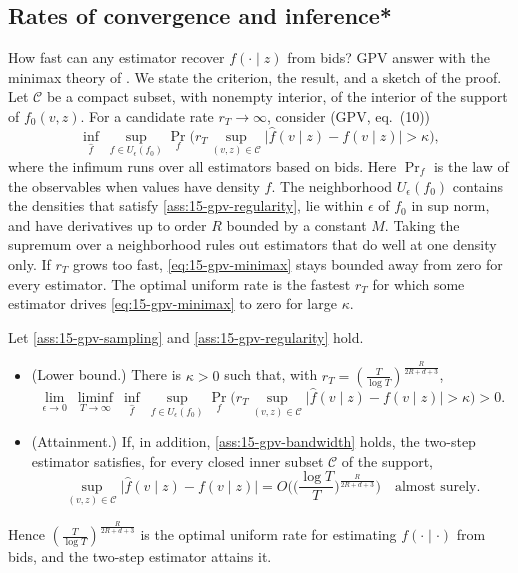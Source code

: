 \subsection{Rates of convergence and inference*}\label{sec:15-gpv-rates}

How fast can any estimator recover $f(\cdot\mid z)$ from bids? GPV answer with the minimax theory of \citet{IbragimovHasminskii1981}. We state the criterion, the result, and a sketch of the proof. Let $\mathcal C$ be a compact subset, with nonempty interior, of the interior of the support of $f_0(v,z)$. For a candidate rate $r_T\to\infty$, consider (GPV, eq.~(10))
\begin{equation}\label{eq:15-gpv-minimax}
\inf_{\hat f}\ \sup_{f\in U_\epsilon(f_0)}\Pr_f\Big(r_T\sup_{(v,z)\in\mathcal C}\big|\hat f(v\mid z)-f(v\mid z)\big|>\kappa\Big),
\end{equation}
where the infimum runs over all estimators based on bids. Here $\Pr_f$ is the law of the observables when values have density $f$. The neighborhood $U_\epsilon(f_0)$ contains the densities that satisfy \cref{ass:15-gpv-regularity}, lie within $\epsilon$ of $f_0$ in sup norm, and have derivatives up to order $R$ bounded by a constant $M$. Taking the supremum over a neighborhood rules out estimators that do well at one density only. If $r_T$ grows too fast, \eqref{eq:15-gpv-minimax} stays bounded away from zero for every estimator. The optimal uniform rate is the fastest $r_T$ for which some estimator drives \eqref{eq:15-gpv-minimax} to zero for large $\kappa$.

\begin{theorem}\label{thm:15-gpv-rate}
Let \cref{ass:15-gpv-sampling} and \cref{ass:15-gpv-regularity} hold.
\begin{itemize}
\item[(i)] (Lower bound.) There is $\kappa>0$ such that, with $r_T=(\frac{T}{\log T})^{\frac{R}{2R+d+3}}$,
\[
\lim_{\epsilon\to0}\ \liminf_{T\to\infty}\ \inf_{\hat f}\ \sup_{f\in U_\epsilon(f_0)}\Pr_f\Big(r_T\sup_{(v,z)\in\mathcal C}\big|\hat f(v\mid z)-f(v\mid z)\big|>\kappa\Big)>0.
\]
\item[(ii)] (Attainment.) If, in addition, \cref{ass:15-gpv-bandwidth} holds, the two-step estimator satisfies, for every closed inner subset $\mathcal C$ of the support,
\[
\sup_{(v,z)\in\mathcal C}\big|\hat f(v\mid z)-f(v\mid z)\big|=O\Big(\Big(\frac{\log T}{T}\Big)^{\frac{R}{2R+d+3}}\Big)\quad\text{almost surely}.
\]
\end{itemize}
Hence $(\frac{T}{\log T})^{\frac{R}{2R+d+3}}$ is the optimal uniform rate for estimating $f(\cdot\mid\cdot)$ from bids, and the two-step estimator attains it.
\end{theorem}

